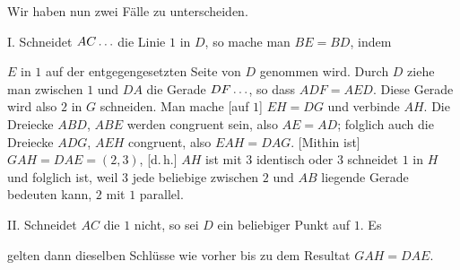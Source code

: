 Wir haben nun zwei Fälle zu unterscheiden.

I. Schneidet $AC\mathinner{.\,.\,.}$ die Linie $1$ in $D$, so mache man $BE = BD$, indem

\begin{center}

\end{center}
\noindent $E$ in $1$ auf der entgegengesetzten Seite von $D$ genommen wird. Durch $D$ ziehe man zwischen $1$ und $DA$ die Gerade $DF\mathinner{.\,.\,.}$, so dass $ADF = AED$. Diese Gerade wird also $2$ in $G$ schneiden. Man mache [auf $1$] $EH = DG$ und verbinde $AH$. Die Dreiecke $ABD$, $ABE$ werden congruent sein, also $AE = AD$; folglich auch die Dreiecke $ADG$, $AEH$ congruent, also $EAH = DAG$. [Mithin ist] $GAH = DAE = (2,3)$, [d.\,h.] $AH$ ist mit $3$ identisch oder $3$ schneidet $1$ in $H$ und folglich ist, weil $3$ jede beliebige zwischen $2$ und $AB$ liegende Gerade bedeuten kann, $2$ mit $1$ parallel.

II. Schneidet $AC$ die $1$ nicht, so sei $D$ ein beliebiger Punkt auf $1$. Es

\begin{center}

\end{center}
\noindent gelten dann dieselben Schlüsse wie vorher bis zu dem Resultat $GAH = DAE$.
